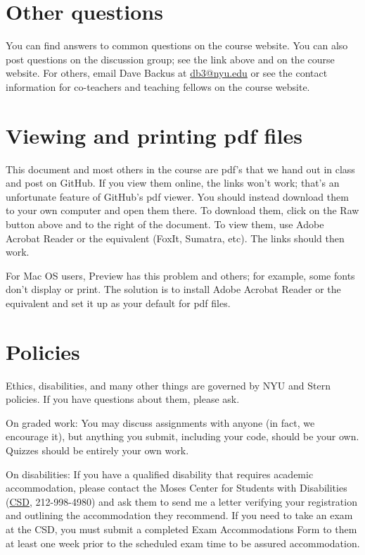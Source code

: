 \documentclass[11pt]{article}
\begin{document}
\section*{Other questions}

You can find answers to common questions on the course website.
You can also post questions on the discussion group;
see the link above and on the course website.
%
%
For others, email Dave Backus at \href{mailto:db3@nyu.edu}{db3@nyu.edu}
or see the contact information for co-teachers and teaching fellows on the course website.


\section*{Viewing and printing pdf files}

This document and most others in the course are pdf's that we hand out in class and post on GitHub.
If you view them online, the links won't work; that's an unfortunate feature of GitHub's pdf viewer.
You should instead download them to your own computer and open them there.
To download them,
click on the Raw button above and to the right of the document.
To view them, use Adobe Acrobat Reader or the equivalent (FoxIt, Sumatra, etc).
The links should then work.

For Mac OS users, Preview has this problem and others; for example,
some fonts don't display or print.
The solution is to install Adobe Acrobat Reader or the equivalent
and set it up as your default for pdf files.


\section*{Policies}

Ethics, disabilities, and many other things are governed by NYU
and Stern policies.
If you have questions about them, please ask.

On graded work:
You may discuss assignments with anyone (in fact, we encourage it),
but anything you submit, including your code, should be your own.
Quizzes should be entirely your own work.

On disabilities:
If you have a qualified disability that requires academic accommodation,
please contact the Moses Center for Students with Disabilities
(\href{http://www.nyu.edu/life/safety-health-wellness/students-with-disabilities.html}{CSD},
212-998-4980) and ask them to
send me a letter verifying your registration and outlining the accommodation they recommend.
If you need to take an exam at the CSD,
you must submit a completed Exam Accommodations Form to them
at least one week prior to the scheduled exam time to be assured accommodation.



\end{document}
